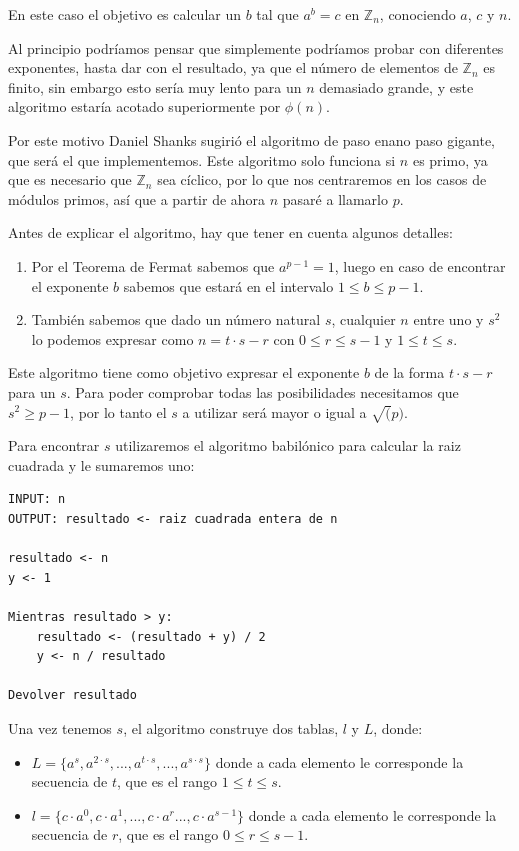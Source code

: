\documentclass[12pt, spanish]{article}
\begin{document}
En este caso el objetivo es calcular un $b$ tal que $a^b = c$ en $\mathbb{Z}_n$, conociendo $a$, $c$ y $n$.

Al principio podríamos pensar que simplemente podríamos probar con diferentes exponentes, hasta dar con el resultado, ya que el número de elementos de $\mathbb{Z}_n$ es finito, sin embargo esto sería muy lento para un $n$ demasiado grande, y este algoritmo estaría acotado superiormente por $\phi(n)$.

Por este motivo Daniel Shanks sugirió el algoritmo de paso enano paso gigante, que será el que implementemos. Este algoritmo solo funciona si $n$ es primo, ya que es necesario que $\mathbb{Z}_n$ sea cíclico, por lo que nos centraremos en los casos de módulos primos, así que a partir de ahora $n$ pasaré a llamarlo $p$.

Antes de explicar el algoritmo, hay que tener en cuenta algunos detalles:

\begin{enumerate}
	\item Por el Teorema de Fermat sabemos que $a^{p - 1} = 1$, luego en caso de encontrar el exponente $b$ sabemos que estará en el intervalo $1 \leq b \leq p - 1$.
	\item  También sabemos que dado un número natural $s$, cualquier $n$ entre uno y $s^2$ lo podemos expresar como $n = t \cdot s - r$ con $0 \leq r \leq s - 1$ y $1 \leq t \leq s$.
\end{enumerate}

Este algoritmo tiene como objetivo expresar el exponente $b$ de la forma $t \cdot s - r$ para un $s$. Para poder comprobar todas las posibilidades necesitamos que $s^2 \geq p - 1$, por lo tanto el $s$ a utilizar será mayor o igual a $\sqrt(p)$.

Para encontrar $s$ utilizaremos el algoritmo babilónico para calcular la raiz cuadrada y le sumaremos uno:

\begin{lstlisting}[caption={Algoritmo babilónico}]
INPUT: n
OUTPUT: resultado <- raiz cuadrada entera de n

resultado <- n
y <- 1

Mientras resultado > y:
	resultado <- (resultado + y) / 2
	y <- n / resultado

Devolver resultado
\end{lstlisting}

Una vez tenemos $s$, el algoritmo construye dos tablas, $l$ y $L$, donde:

\begin{itemize}
	\item $L = \{a^{s}, a^{2 \cdot s}, ..., a^{t \cdot s}, ..., a^{s \cdot s}\}$ donde a cada elemento le corresponde la secuencia de $t$, que es el rango $1 \leq t \leq s$.
	\item $l = \{c \cdot a^0, c \cdot a^1, ..., c \cdot a^{r} ..., c \cdot a^{s - 1} \}$ donde a cada elemento le corresponde la secuencia de $r$, que es el rango $0 \leq r \leq s - 1$.
\end{itemize}
\end{document}
